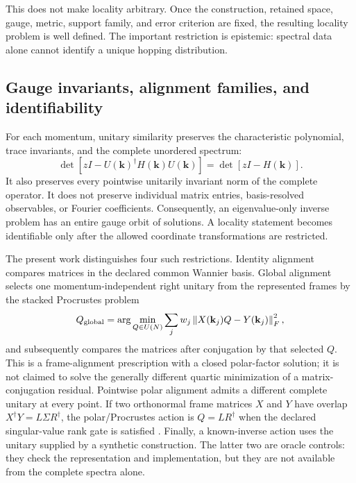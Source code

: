 \documentclass[11pt]{article}
\theoremstyle{definition}
\newcommand{\norm}[1]{\left\lVert#1\right\rVert}
\newcommand{\kvec}{\mathbf k}
\begin{document}
This does not make locality arbitrary.  Once the construction, retained space, gauge,
metric, support family, and error criterion are fixed, the resulting locality problem is
well defined.  The important restriction is epistemic: spectral data alone cannot
identify a unique hopping distribution.

\subsection{Gauge invariants, alignment families, and identifiability}

For each momentum, unitary similarity preserves the characteristic polynomial,
trace invariants, and the complete unordered spectrum:
\begin{equation}
 \det[zI-U(\kvec)^\dagger H(\kvec)U(\kvec)]
 =\det[zI-H(\kvec)].
 \label{eq:characteristic-invariance}
\end{equation}
It also preserves every pointwise unitarily invariant norm of the complete operator.
It does not preserve individual matrix entries, basis-resolved observables, or Fourier
coefficients.  Consequently, an eigenvalue-only inverse problem has an entire gauge
orbit of solutions.  A locality statement becomes identifiable only after the allowed
coordinate transformations are restricted.

The present work distinguishes four such restrictions.  Identity alignment compares
matrices in the declared common Wannier basis.  Global alignment selects one
momentum-independent right unitary from the represented frames by the stacked
Procrustes problem
\begin{equation}
 Q_{\rm global}=\arg\min_{Q\in U(N)}
 \sum_j w_j\norm{X(\kvec_j)Q-Y(\kvec_j)}_F^2,
 \label{eq:global-alignment}
\end{equation}
and subsequently compares the matrices after conjugation by that selected $Q$.  This is
a frame-alignment prescription with a closed polar-factor solution; it is not claimed to
solve the generally different quartic minimization of a matrix-conjugation residual.
Pointwise polar alignment admits a different complete unitary at every point.  If two
orthonormal frame matrices $X$ and $Y$ have overlap $X^\dagger Y=L\Sigma R^\dagger$,
the polar/Procrustes action is $Q=LR^\dagger$ when the declared singular-value rank gate
is satisfied \cite{schonemann1966,higham1986}.  Finally, a known-inverse action uses the
unitary supplied by a synthetic construction.  The latter two are oracle controls: they
check the representation and implementation, but they are not available from the
complete spectra alone.
\end{document}
